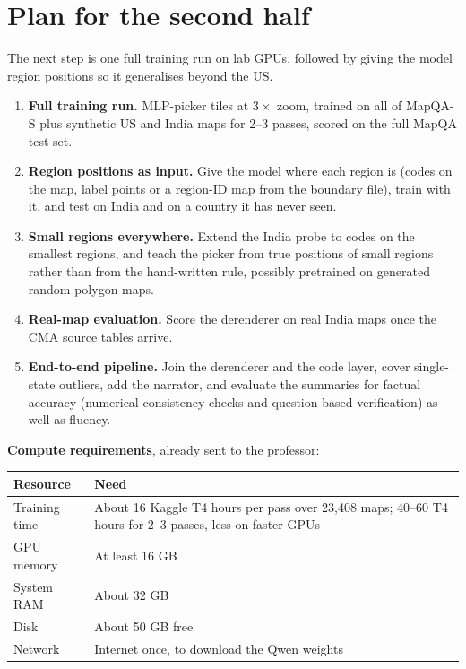 \documentclass[11pt,a4paper]{article}
\begin{document}
\section{Plan for the second half}
The next step is one full training run on lab GPUs, followed by giving the model region positions so it generalises beyond the US.
\begin{enumerate}
\item \textbf{Full training run.} MLP-picker tiles at $3\times$ zoom, trained on all of MapQA-S plus synthetic US and India maps for 2--3 passes, scored on the full MapQA test set.
\item \textbf{Region positions as input.} Give the model where each region is (codes on the map, label points or a region-ID map from the boundary file), train with it, and test on India and on a country it has never seen.
\item \textbf{Small regions everywhere.} Extend the India probe to codes on the smallest regions, and teach the picker from true positions of small regions rather than from the hand-written rule, possibly pretrained on generated random-polygon maps.
\item \textbf{Real-map evaluation.} Score the derenderer on real India maps once the CMA source tables arrive.
\item \textbf{End-to-end pipeline.} Join the derenderer and the code layer, cover single-state outliers, add the narrator, and evaluate the summaries for factual accuracy (numerical consistency checks and question-based verification) as well as fluency.
\end{enumerate}

\textbf{Compute requirements}, already sent to the professor:
\begin{center}
\small
\begin{tabularx}{\textwidth}{@{}lL@{}}
\toprule
Resource & Need\\
\midrule
Training time & About 16 Kaggle T4 hours per pass over 23,408 maps; 40--60 T4 hours for 2--3 passes, less on faster GPUs\\
GPU memory & At least 16 GB\\
System RAM & About 32 GB\\
Disk & About 50 GB free\\
Network & Internet once, to download the Qwen weights\\
\bottomrule
\end{tabularx}
\end{center}
\end{document}
